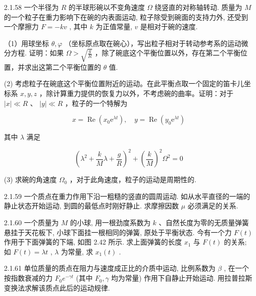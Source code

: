 \begin{problem}{2.1.58}
一个半径为 $R$ 的半球形碗以不变角速度 $\Omega$ 绕竖直的对称轴转动. 质量为 $M$ 的一个粒子在重力影响下在碗的内表面运动, 粒子除受到碗面的支持力外, 还受到一个摩擦力 $F = -kv$ , 其中 $k$ 为正值常量, $v$ 是相对于碗的速度.

（1）用球坐标 $\theta, \varphi$ （坐标原点取在碗心），写出粒子相对于转动参考系的运动微分方程. 证明：如果 $\Omega > \sqrt{\frac{g}{R}}$ ，除了碗底这个平衡位置以外，存在第二个平衡位置，并求出这第二个平衡位置的 $\theta$ 值.

(2) 考虑粒子在碗底这个平衡位置附近的运动。在此平衡点取一个固定的笛卡儿坐标系 $x, y, z$ ，除计算重力提供的恢复力以外，不考虑碗的曲率。证明：对于 $|x| \ll R$ 、 $|y| \ll R$ ，粒子的一个特解为

\[
x = \operatorname{Re} (x _ {0} \mathrm{e} ^ {\lambda t}), \quad y = \operatorname{Re} (y _ {0} \mathrm{e} ^ {\lambda t})
\]

其中 $\lambda$ 满足

\[
\left(\lambda^ {2} + \frac {k}{M} \lambda + \frac {g}{R}\right) ^ {2} + \left(\frac {k}{M}\right) ^ {2} \Omega^ {2} = 0
\]

(3) 求碗的角速度 $\Omega_{0}$ ，对于此角速度，粒子的运动是周期性的.
\end{problem}
\clearpage


\begin{problem}{2.1.59}
一个质点在重力作用下沿一粗糙的竖直的圆周运动. 如从水平直径的一端的静止状态开始运动, 到圆的最低点时刚好静止. 求摩擦因数 $\mu$ 必须满足的关系.
\end{problem}
\clearpage


\begin{problem}{2.1.60}
一个质量为 $M$ 的小球, 用一根劲度系数为 $k$ 、自然长度为零的无质量弹簧悬挂于天花板下, 小球下面挂一根相同的弹簧, 原处于平衡状态. 今有一个力 $F(t)$ 作用于下面弹簧的下端, 如图 2.42 所示. 求上面弹簧的长度 $x_{1}$ 与 $F(t)$ 的关系; 如 $F(t) = \lambda t$ , $\lambda$ 为常量, 求 $x_{1}(t)$ .
\begin{center}

\end{center}
\end{problem}
\clearpage


\begin{problem}{2.1.61}
单位质量的质点在阻力与速度成正比的介质中运动, 比例系数为 $\beta$ , 在一个按指数衰减的力 $F_{0}e^{-\gamma t}$ (其中 $F_{0}, \gamma$ 均为常量) 作用下自静止开始运动. 用拉普拉斯变换法求解该质点此后的运动规律.
\end{problem}
\clearpage


